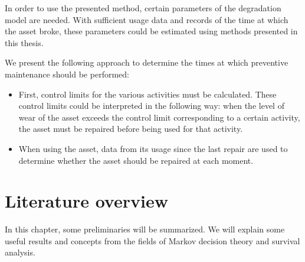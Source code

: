 In order to use the presented method, certain parameters of the degradation model are needed.
With sufficient usage data and records of the time at which the asset broke, these parameters could be estimated using methods presented in this thesis.

We present the following approach to determine the times at which preventive maintenance should be performed:
\begin{itemize}
	\item First, control limits for the various activities must be calculated.
	These control limits could be interpreted in the following way:
	when the level of wear of the asset exceeds the control limit corresponding to a certain activity, the asset must be repaired before being used for that activity.
	\item When using the asset, data from its usage since the last repair are used to determine whether the asset should be repaired at each moment.
\end{itemize}







\tableofcontents

\mainmatter



\chapter{Literature overview}\label{chapter:literatureOverview}
In this chapter, some preliminaries will be summarized.
We will explain some useful results and concepts from the fields of Markov decision theory and survival analysis.

